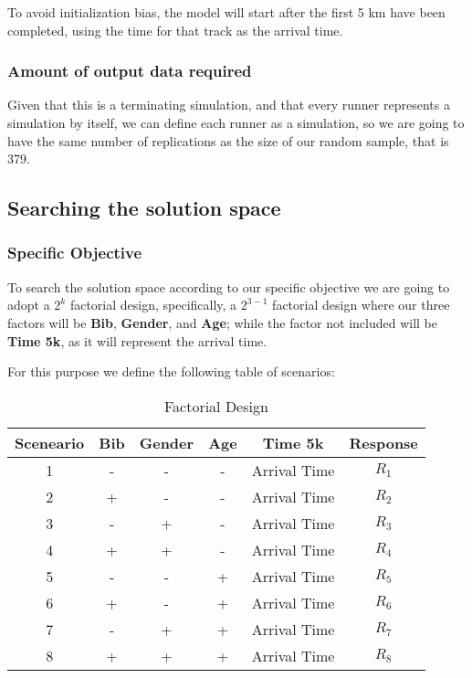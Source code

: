 \documentclass[11pt, oneside]{article}   	%
\begin{document}
To avoid initialization bias, the model will start after the first 5 km have been completed, using the time for that track as the arrival time.

\subsubsection{Amount of output data required}
Given that this is a terminating simulation, and that every runner represents a simulation by itself, we can define each runner as a simulation, so we are going to have the same number of replications as the size of our random sample, that is 379.

\subsection{Searching the solution space}
\subsubsection{Specific Objective}
To search the solution space according to our specific objective we are going to adopt a $2^k$ factorial design, specifically, a $2^{3-1}$ factorial design where our three factors will be \textbf{Bib}, \textbf{Gender}, and \textbf{Age}; while the factor not included will be \textbf{Time 5k}, as it will represent the arrival time.

For this purpose we define the following table of scenarios:

\begin{table}[H]
\caption{Factorial Design}
\begin{center}
 \begin{tabular}{|c|c|c|c|c|c|}
 \hline
  Sceneario & Bib & Gender & Age & Time 5k & Response \\ 
  \hline \hline
  1 & - & - & - & Arrival Time & $R_1$\\ 
  2 & + & - & - & Arrival Time & $R_2$\\
  3 & - & + & - & Arrival Time & $R_3$\\
  4 & + & + & - & Arrival Time & $R_4$\\
  5 & - & - & + & Arrival Time & $R_5$\\
  6 & + & - & + & Arrival Time & $R_6$\\
  7 & - & + & + & Arrival Time & $R_7$\\
  8 & + & + & + & Arrival Time & $R_8$\\
 \hline
\end{tabular}
\end{center}
\label{table: factorial design}
\end{table}
\end{document}
